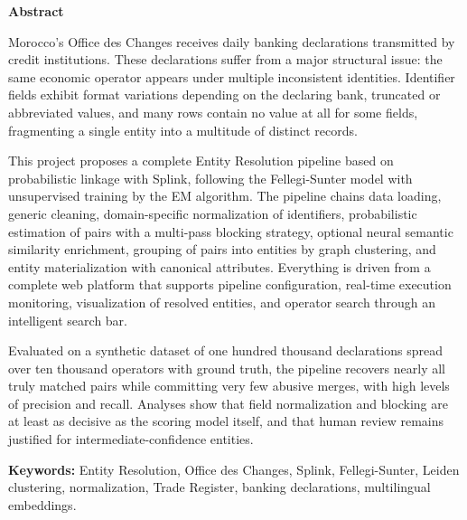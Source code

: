 
\newpage

\begin{center}
    \begin{minipage}{0.9\textwidth}
        \centering
        \textbf{Abstract}

        \medskip
        \begin{justify}
Morocco's Office des Changes receives daily banking declarations transmitted by credit institutions. These declarations suffer from a major structural issue: the same economic operator appears under multiple inconsistent identities. Identifier fields exhibit format variations depending on the declaring bank, truncated or abbreviated values, and many rows contain no value at all for some fields, fragmenting a single entity into a multitude of distinct records.

This project proposes a complete Entity Resolution pipeline based on probabilistic linkage with Splink, following the Fellegi-Sunter model with unsupervised training by the EM algorithm. The pipeline chains data loading, generic cleaning, domain-specific normalization of identifiers, probabilistic estimation of pairs with a multi-pass blocking strategy, optional neural semantic similarity enrichment, grouping of pairs into entities by graph clustering, and entity materialization with canonical attributes. Everything is driven from a complete web platform that supports pipeline configuration, real-time execution monitoring, visualization of resolved entities, and operator search through an intelligent search bar.

Evaluated on a synthetic dataset of one hundred thousand declarations spread over ten thousand operators with ground truth, the pipeline recovers nearly all truly matched pairs while committing very few abusive merges, with high levels of precision and recall. Analyses show that field normalization and blocking are at least as decisive as the scoring model itself, and that human review remains justified for intermediate-confidence entities.
        \end{justify}

        \bigskip
        \textbf{Keywords:} Entity Resolution, Office des Changes, Splink, Fellegi-Sunter, Leiden clustering, normalization, Trade Register, banking declarations, multilingual embeddings.
    \end{minipage}
\end{center}
